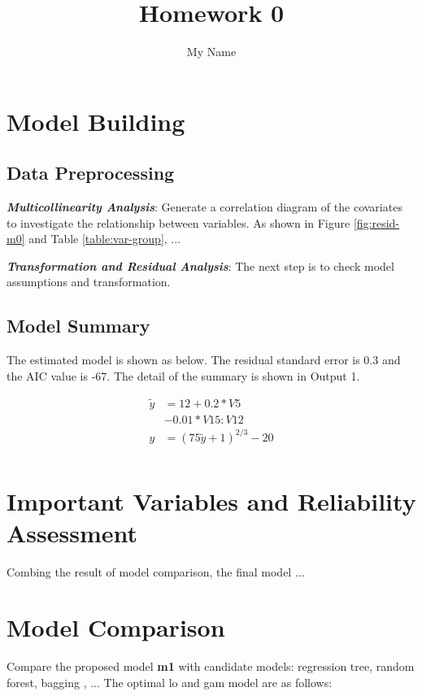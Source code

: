 \documentclass[11pt a4paper]{article}
\begin{document}
\title{Homework 0}
\author{My Name}  %
\date{\vspace{-5ex}}  %
\maketitle

\section{Model Building}

\subsection{Data Preprocessing}

\textbf{\textit{Multicollinearity Analysis}}: Generate a correlation diagram of the covariates to investigate the relationship between variables. As shown in Figure \ref{fig:resid-m0} and Table   \ref{table:var-group}, ...


\textbf{\textit{Transformation and Residual Analysis}}: The next step is to check model assumptions and transformation.


\subsection{Model Summary}
The estimated model is shown as below. The residual standard error is 0.3 and the AIC value is -67. The detail of the summary is shown in Output 1.

\begin{equation}\nonumber
\begin{aligned}
\tilde{y} &=12 + 0.2*V5\\
&- 0.01*V15:V12 \\
y &= (75\tilde{y}+1)^{2/3}-20 \\
\end{aligned}
\end{equation}






\section{Important Variables and Reliability Assessment}
Combing the result of model comparison, the final model ...


\section{Model Comparison}
Compare the proposed model \textbf{m1} with candidate models: regression tree, random forest, bagging \cite{faraway2016extending} , ... The optimal lo and gam model are as follows:

\end{document}
